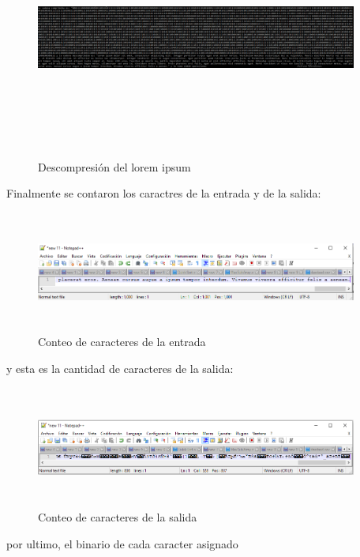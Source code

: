 \documentclass[spanish]{article}
\begin{document}
	\begin{figure}[H]
		\centering
		\includegraphics[width=400px,height=300px]{captura6}
		\caption{Descompresión del lorem ipsum}
	\end{figure}
	Finalmente se contaron los caractres de la entrada y de la salida:
	\begin{figure}[H]
		\centering
		\includegraphics[width=400px,height=150px]{captura7}
		\caption{Conteo de caracteres de la entrada}
	\end{figure}
	y esta es la cantidad de caracteres de la salida:
	\begin{figure}[H]
		\centering
		\includegraphics[width=400px,height=150px]{captura8}
		\caption{Conteo de caracteres de la salida}
	\end{figure}
	por ultimo, el binario de cada caracter asignado
\end{document}
